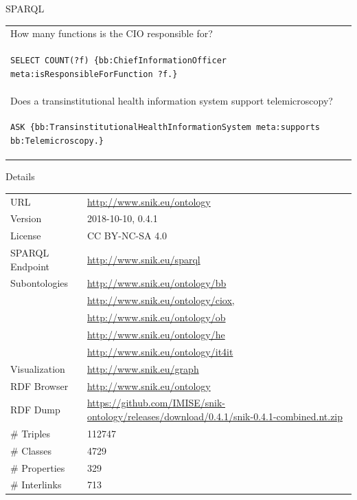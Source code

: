 \documentclass[portrait,final,a0paper,fontscale=0.277]{baposter}
\begin{document}
\begin{poster}
\begin{posterbox}[name=sparql,column=1,span=2,above=bottom]{SPARQL}
{\begin{tabular*}{\columnwidth}{l}
How many functions is the CIO responsible for?\\
\begin{lstlisting}
SELECT COUNT(?f) {bb:ChiefInformationOfficer meta:isResponsibleForFunction ?f.}
\end{lstlisting}\\

Does a transinstitutional health information system support telemicroscopy?\\
\begin{lstlisting}
ASK {bb:TransinstitutionalHealthInformationSystem meta:supports bb:Telemicroscopy.}
\end{lstlisting}
\end{tabular*}
}
\vspace{0.0em}
\end{posterbox}
\begin{posterbox}[name=source,column=1,span=2,above=sparql,below=background]{Details}
\begin{tabulary}{\columnwidth}{lL}
URL		&\url{http://www.snik.eu/ontology}\\
Version		&2018-10-10, 0.4.1\\
License		&CC BY-NC-SA 4.0\\
SPARQL Endpoint	&\url{http://www.snik.eu/sparql}\\
Subontologies	&\url{http://www.snik.eu/ontology/bb}\\
		&\url{http://www.snik.eu/ontology/ciox,}\\
		&\url{http://www.snik.eu/ontology/ob}\\
		&\url{http://www.snik.eu/ontology/he}\\
		&\url{http://www.snik.eu/ontology/it4it}\\
Visualization	&\url{http://www.snik.eu/graph}\\
RDF Browser	&\url{http://www.snik.eu/ontology}\\
RDF Dump	&\url{https://github.com/IMISE/snik-ontology/releases/download/0.4.1/snik-0.4.1-combined.nt.zip}\\
\# Triples	&\num{112747}\\
\# Classes	&\num{4729}\\
\# Properties	&\num{329}\\
\# Interlinks	&\num{713}\\
\end{tabulary}%
\end{posterbox}
\end{poster}
\end{document}
